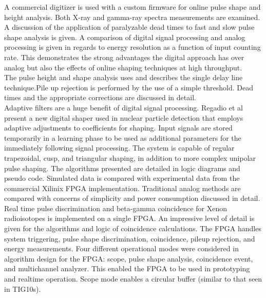 \documentclass[12pt]{article}
\begin{document}
\begin{doublespacing}
{\large\textbf{\cite{Abbene2013124}}}
A commercial digitizer is used with a custom firmware for online pulse shape and height analysis. Both X-ray and gamma-ray spectra measurements are examined. A discussion of the application of paralyzable dead times to fast and slow pulse shape analysis is given. A comparison of digital signal processing and analog processing is given in regards to energy resolution as a function of input counting rate. This demonstrates the strong advantages the digital approach has over analog but also the effects of online shaping techniques at high throughput.
\\
The pulse height and shape analysis uses and describes the single delay line technique.Pile up rejection is performed by the use of a simple threshold. Dead times and the appropriate corrections are discussed in detail.
\\[20pt]


{\large\textbf{\cite{Regadio2014297}}}
Adaptive filters are a huge benefit of digital signal processing. Regadio et al present a new digital shaper used in nuclear particle detection that employs adaptive adjustments to coefficients for shaping. Input signals are stored temporarily in a learning phase to be used as additional parameters for the immediately following signal processing. The system is capable of regular trapezoidal, cusp, and triangular shaping, in addition to more complex unipolar pulse shaping. The algorithms presented are detailed in logic diagrams and pseudo code. Simulated data is compared with experimental data from the commercial Xilinix FPGA implementation. Traditional analog methods are compared with concerns of simplicity and power consumption discussed in detail.
\\[20pt]


{\large\textbf{\cite{Farsoni201375}}}
Real time pulse discrimination and beta-gamma coincidence for Xenon radioisotopes is implemented on a single FPGA. An impressive level of detail is given for the algorithms and logic of coincidence calculations. The FPGA handles system triggering, pulse shape discrimination, coincidence, pileup rejection, and energy measurements. Four different operational modes were considered in algorithm design for the FPGA: scope, pulse shape analysis, coincidence event, and multichannel analyzer. This enabled the FPGA to be used in prototyping and realtime operation. Scope mode enables a circular buffer (similar to that seen in TIG10s).
\\[20pt]



\end{doublespacing}
\end{document}
